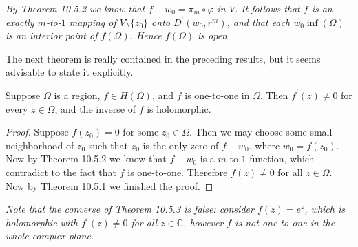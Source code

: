 \begin{note}\em
By Theorem 10.5.2 we know that $f-w_0=\pi_m\circ\varphi$ in $V$. It follows that $f$ is an exactly $m$-to-$1$ mapping of $V\setminus\{z_0\}$ onto $D^\prime(w_0,r^m)$, and that each $w_0\inf(\Omega)$ is an interior point of $f(\Omega)$. Hence $f(\Omega)$ is open.
\end{note}
The next theorem is really contained in the preceding results, but it seems advisable to state it explicitly.
\begin{theorem}
Suppose $\Omega$ is a region, $f\in H(\Omega)$, and $f$ is one-to-one in $\Omega$. Then $f^\prime(z)\ne 0$ for every $z\in\Omega$, and the inverse of $f$ is holomorphic.
\end{theorem}
\begin{proof}
Suppose $f(z_0)=0$ for some $z_0\in\Omega$. Then we may choose some small neighborhood of $z_0$ such that $z_0$ is the only zero of $f-w_0$, where $w_0=f(z_0)$. Now by Theorem 10.5.2 we know that $f-w_0$ is a $m$-to-$1$ function, which contradict to the fact that $f$ is one-to-one. Therefore $f(z)\ne 0$ for all $z\in\Omega$. Now by Theorem 10.5.1 we finished the proof.
\end{proof}
\begin{note}\em
Note that the converse of Theorem 10.5.3 is false: consider $f(z)=e^z$, which is holomorphic with $f^\prime(z)\ne 0$ for all $z\in\mathbb{C}$, however $f$ is not one-to-one in the whole complex plane.
\end{note}
